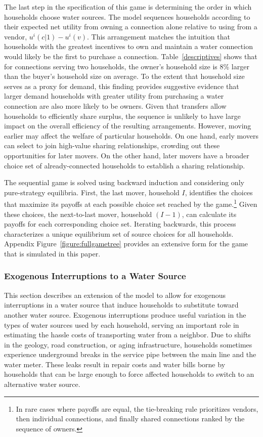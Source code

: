 \documentclass[12pt]{article}
\begin{document}
The last step in the specification of this game is determining the order in which households choose water sources.  The model sequences households according to their expected net utility from owning a connection alone relative to using from a vendor, $u^{i}(c|1) - u^{i}(v)$.  This arrangement matches the intuition that households with the greatest incentives to own and maintain a water connection would likely be the first to purchase a connection.  Table~\ref{descriptives} shows that for connections serving two households, the owner's household size is 8\% larger than the buyer's household size on average.  To the extent that household size serves as a proxy for demand, this finding provides suggestive evidence that larger demand households with greater utility from purchasing a water connection are also more likely to be owners.  Given that transfers allow households to efficiently share surplus, the sequence is unlikely to have large impact on the overall efficiency of the resulting arrangements.  However, moving earlier may affect the welfare of particular households.  On one hand, early movers can select to join high-value sharing relationships, crowding out these opportunities for later movers.  On the other hand, later movers have a broader choice set of already-connected households to establish a sharing relationship.

The sequential game is solved using backward induction and considering only pure-strategy equilibria.  First, the last mover, household $I$, identifies the choices that maximize its payoffs at each possible choice set reached by the game.\footnote{In rare cases where payoffs are equal, the tie-breaking rule prioritizes vendors, then individual connections, and finally shared connections ranked by the sequence of owners.}  Given these choices, the next-to-last mover, household $(I-1)$, can calculate its payoffs for each corresponding choice set.  Iterating backwards, this process characterizes a unique equilibrium set of source choices for all households.  Appendix Figure~\ref{figure:fullgametree} provides an extensive form for the game that is simulated in this paper.


\subsubsection{Exogenous Interruptions to a Water Source}\label{section:hasslemodel}

This section describes an extension of the model to allow for exogenous interruptions in a water source that induce households to substitute toward another water source.  Exogenous interruptions produce useful variation in the types of water sources used by each household, serving an important role in estimating the hassle costs of transporting water from a neighbor.  Due to shifts in the geology, road construction, or aging infrastructure, households sometimes experience underground breaks in the service pipe between the main line and the water meter.  These leaks result in repair costs and water bills borne by households that can be large enough to force affected households to switch to an alternative water source.
\end{document}
